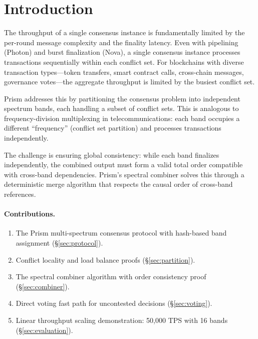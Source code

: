 \section{Introduction}

\label{sec:introduction}

The throughput of a single consensus instance is fundamentally limited by the per-round
message complexity and the finality latency. Even with pipelining (Photon) and burst
finalization (Nova), a single consensus instance processes transactions sequentially
within each conflict set. For blockchains with diverse transaction types---token
transfers, smart contract calls, cross-chain messages, governance votes---the aggregate
throughput is limited by the busiest conflict set.

Prism addresses this by partitioning the consensus problem into independent spectrum
bands, each handling a subset of conflict sets. This is analogous to frequency-division
multiplexing in telecommunications: each band occupies a different ``frequency''
(conflict set partition) and processes transactions independently.

The challenge is ensuring global consistency: while each band finalizes independently,
the combined output must form a valid total order compatible with cross-band dependencies.
Prism's spectral combiner solves this through a deterministic merge algorithm that
respects the causal order of cross-band references.

\paragraph{Contributions.}
\begin{enumerate}[nosep]
\item The Prism multi-spectrum consensus protocol with hash-based band assignment (\S\ref{sec:protocol}).
\item Conflict locality and load balance proofs (\S\ref{sec:partition}).
\item The spectral combiner algorithm with order consistency proof (\S\ref{sec:combiner}).
\item Direct voting fast path for uncontested decisions (\S\ref{sec:voting}).
\item Linear throughput scaling demonstration: 50,000 TPS with 16 bands (\S\ref{sec:evaluation}).
\end{enumerate}

